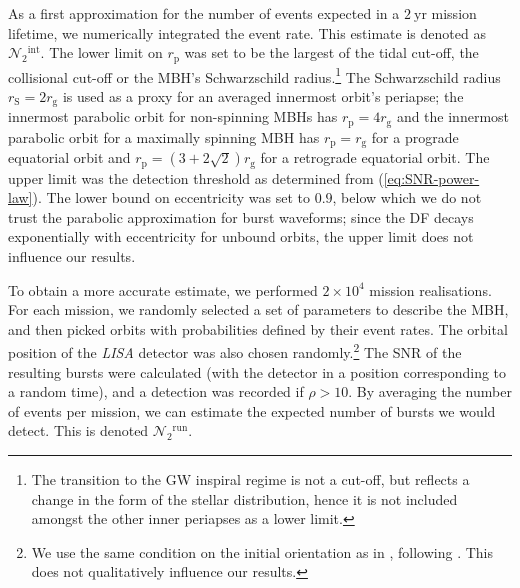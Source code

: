 \documentclass[useAMS,usedcolumn,usegraphicx,usenatbib]{mn2e}
\newcommand{\eqnref}[1]{(\ref{eq:#1})}
\newcommand{\units}[1]{\ensuremath{~\mathrm{#1}}}
\newcommand{\sub}[1]{\ensuremath{_\mathrm{#1}}}
\newcommand{\super}[1]{\ensuremath{^\mathrm{#1}}}
\begin{document}
As a first approximation for the number of events expected in a $2\units{yr}$ mission lifetime, we numerically integrated the event rate. This estimate is denoted as $\mathcal{N}_2\super{int}$. The lower limit on $r\sub{p}$ was set to be the largest of the tidal cut-off, the collisional cut-off or the MBH's Schwarzschild radius.\footnote{The transition to the GW inspiral regime is not a cut-off, but reflects a change in the form of the stellar distribution, hence it is not included amongst the other inner periapses as a lower limit.} The Schwarzschild radius $r\sub{S} = 2 r\sub{g}$ is used as a proxy for an averaged innermost orbit's periapse; the innermost parabolic orbit for non-spinning MBHs has $r\sub{p} = 4r\sub{g}$ and the innermost parabolic orbit for a maximally spinning MBH has $r\sub{p} = r\sub{g}$ for a prograde equatorial orbit and $r\sub{p} = (3 + 2\sqrt{2})r\sub{g}$ for a retrograde equatorial orbit. The upper limit was the detection threshold as determined from \eqnref{SNR-power-law}. The lower bound on eccentricity was set to $0.9$, below which we do not trust the parabolic approximation for burst waveforms; since the DF decays exponentially with eccentricity for unbound orbits, the upper limit does not influence our results.

To obtain a more accurate estimate, we performed $2 \times 10^4$ mission realisations. For each mission, we randomly selected a set of parameters to describe the MBH, and then picked orbits with probabilities defined by their event rates. The orbital position of the \textit{LISA} detector was also chosen randomly.\footnote{We use the same condition on the initial orientation as in \citet{Berry2013}, following \citet{Cutler1998}. This does not qualitatively influence our results.} The SNR of the resulting bursts were calculated (with the detector in a position corresponding to a random time), and a detection was recorded if $\rho > 10$. By averaging the number of events per mission, we can estimate the expected number of bursts we would detect. This is denoted $\mathcal{N}_2\super{run}$.
\end{document}
